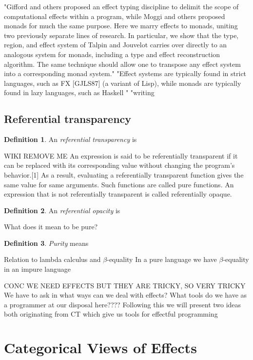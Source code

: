 \documentclass[a4paper,10pt]{article}
\theoremstyle{definition}
\newtheorem{definition}{Definition}[section]
\begin{document}
"Gifford and others proposed an effect typing discipline to delimit the scope of computational effects within a program, while Moggi and others proposed monads for much the same purpose. Here we marry effects to monads, uniting two previously separate lines of research. In particular, we show that the type, region, and effect system of Talpin and Jouvelot carries over directly to an analogous system for monads, including a type and effect reconstruction algorithm. The same technique should allow one to transpose any effect system into a corresponding monad system."
"Effect systems are typically found in strict languages, such as FX [GJLS87] (a variant of Lisp), while monads are typically found in lazy languages, such as Haskell "
"writing %
\cite{wadler2003marriage}

\subsection{Referential transparency}
\begin{definition}
    An \textit{referential transparency} is
\end{definition}
WIKI REMOVE ME
An expression is said to be referentially transparent if it can be replaced with its corresponding value without changing the program's behavior.[1] As a result, evaluating a referentially transparent function gives the same value for same arguments. Such functions are called pure functions. An expression that is not referentially transparent is called referentially opaque.
\begin{definition}
    An \textit{referential opacity} is
\end{definition}

What does it mean to be pure?
\begin{definition}
    \textit{Purity} means
\end{definition}

Relation to lambda calculus and $\beta$-equality
In a pure language we have $\beta$-equality
in an impure language 

CONC WE NEED EFFECTS BUT THEY ARE TRICKY, SO VERY TRICKY
We have to ask in what ways can we deal with effects?
What tools do we have as a programmer at our disposal here????
Following this we will present two ideas both originating from CT
which give us tools for effectful programming

\pagebreak
\section{Categorical Views of Effects}
\end{document}
